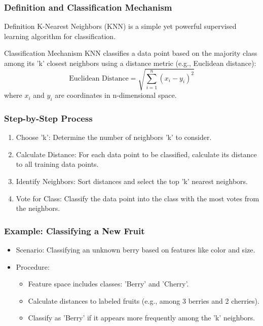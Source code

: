 \documentclass[aspectratio=169]{beamer}
\begin{document}
\begin{frame}
    \frametitle{Definition and Classification Mechanism}
    \begin{block}{Definition}
        K-Nearest Neighbors (KNN) is a simple yet powerful supervised learning algorithm for classification.
    \end{block}
    
    \begin{block}{Classification Mechanism}
        KNN classifies a data point based on the majority class among its 'k' closest neighbors using a distance metric (e.g., Euclidean distance):
        \begin{equation}
            \text{Euclidean Distance} = \sqrt{\sum_{i=1}^{n}(x_i - y_i)^2}
        \end{equation}
        where \(x_i\) and \(y_i\) are coordinates in n-dimensional space.
    \end{block}
\end{frame}

\begin{frame}
    \frametitle{Step-by-Step Process}
    \begin{enumerate}
        \item Choose 'k': Determine the number of neighbors 'k' to consider.
        \item Calculate Distance: For each data point to be classified, calculate its distance to all training data points.
        \item Identify Neighbors: Sort distances and select the top 'k' nearest neighbors.
        \item Vote for Class: Classify the data point into the class with the most votes from the neighbors.
    \end{enumerate}
\end{frame}

\begin{frame}
    \frametitle{Example: Classifying a New Fruit}
    \begin{itemize}
        \item Scenario: Classifying an unknown berry based on features like color and size.
        \item Procedure: 
        \begin{itemize}
            \item Feature space includes classes: 'Berry' and 'Cherry'.
            \item Calculate distances to labeled fruits (e.g., among 3 berries and 2 cherries).
            \item Classify as 'Berry' if it appears more frequently among the 'k' neighbors.
        \end{itemize}
    \end{itemize}
\end{frame}
\end{document}
